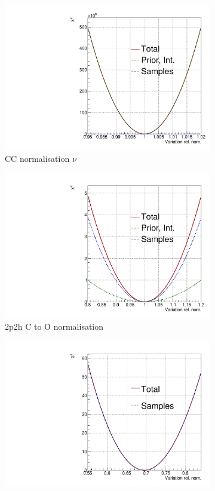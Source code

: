\begin{figure}
\centering
\begin{subfigure}{.49\textwidth}
  \centering
  \includegraphics[width=0.7\linewidth]{figs/llh/CC_norm_nu_llh.pdf}
  \caption{CC normalisation $\nu$}
\end{subfigure}
\begin{subfigure}{.49\textwidth}
  \centering
  \includegraphics[width=0.7\linewidth]{figs/llh/2p2h_normCtoO_llh.pdf}
  \caption{2p2h C to O normalisation}
\end{subfigure}
\begin{subfigure}{.49\textwidth}
  \centering
  \includegraphics[width=0.7\linewidth]{figs/llh/Q2_norm_1_llh.pdf}

\end{subfigure}
\end{figure}
